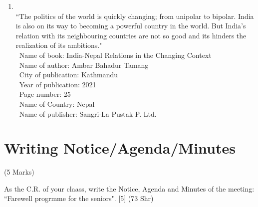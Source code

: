 \documentclass[12pt]{article}
\newcommand{\enter}{\\\textcolor{white}{1}}
\begin{document}
\begin{enumerate}
\begin{enumerate}
        \item {}\\
          ``The politics of the world is quickly changing; from unipolar to bipolar. India is also on its way to becoming a powerful country in the world. But India's relation with its neighbouring countries are not so good and its hinders the realization of its ambitions."
          \enter Name of book: India-Nepal Relations in the Changing Context
          \enter Name of author: Ambar Bahadur Tamang
          \enter City of publication: Kathmandu
          \enter Year of publication: 2021
          \enter Page number: 25
          \enter Name of Country: Nepal
          \enter Name of publisher: Sangri-La Pustak P. Ltd.

      \end{enumerate}
  \end{enumerate}
\pagebreak

\section{Writing Notice/Agenda/Minutes}
  \begin{center}(5 Marks)\end{center}

  As the C.R. of your claass, write the Notice, Agenda and Minutes of the meeting: ``Farewell progrmme for the seniors". \hfill [5] (73 Shr)
\end{document}
